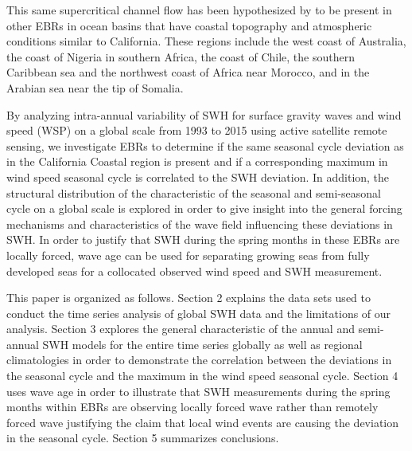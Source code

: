 \documentclass[draft,linenumbers]{agujournal2018}
\begin{document}

This same supercritical channel flow has been hypothesized by  \citet{winant1988marine} to be present in other EBRs in ocean basins that have coastal topography and atmospheric conditions similar to California. These regions include the west coast of Australia, the coast of Nigeria in southern Africa, the coast of Chile, the southern Caribbean sea and the northwest coast of Africa near Morocco, and in the Arabian sea near the tip of Somalia. 

By analyzing intra-annual variability of SWH for surface gravity waves and wind speed (WSP) on a global scale from 1993 to 2015 using active satellite remote sensing, we investigate EBRs to determine if the same seasonal cycle deviation as in the California Coastal region is present and if a corresponding maximum in wind speed seasonal cycle is correlated to the SWH deviation. In addition, the structural distribution of the characteristic of the seasonal and semi-seasonal cycle on a global scale is explored in order to give insight into the general forcing mechanisms and characteristics of the wave field influencing these deviations in SWH\@. In order to justify that SWH during the spring months in these EBRs are locally forced, wave age can be used for separating growing seas from fully developed seas for a collocated observed wind speed and SWH measurement.

This paper is organized as follows.  Section 2 explains the data sets used to conduct the time series analysis of global SWH data and the limitations of our analysis.  Section 3 explores the general characteristic of the annual and semi-annual SWH models for the entire time series globally as well as regional climatologies in order to demonstrate the correlation between the deviations in the seasonal cycle and the maximum in the wind speed seasonal cycle.  Section 4 uses wave age in order to illustrate that SWH measurements during the spring months within EBRs are observing locally forced wave rather than remotely forced wave justifying the claim that local wind events are causing the deviation in the seasonal cycle.  Section 5 summarizes conclusions.
\end{document}
